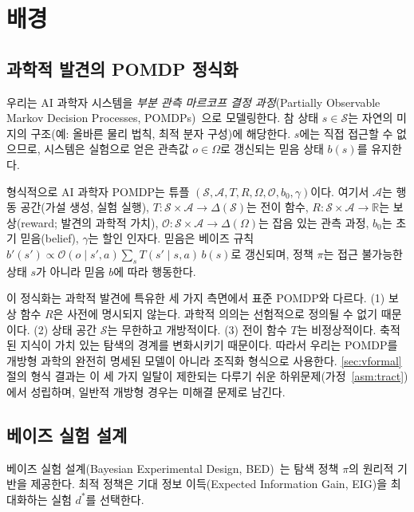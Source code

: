 \documentclass[11pt]{article}
\begin{document}
\section{배경}
\label{sec:background}

\subsection{과학적 발견의 POMDP 정식화}

우리는 AI 과학자 시스템을 \emph{부분 관측 마르코프 결정 과정}(Partially Observable Markov Decision Processes, POMDPs)~\citep{kaelbling1998pomdp}으로 모델링한다. 참 상태 $s \in \mathcal{S}$는 자연의 미지의 구조(예: 올바른 물리 법칙, 최적 분자 구성)에 해당한다. $s$에는 직접 접근할 수 없으므로, 시스템은 실험으로 얻은 관측값 $o \in \Omega$로 갱신되는 믿음 상태 $b(s)$를 유지한다.

형식적으로 AI 과학자 POMDP는 튜플 $(\mathcal{S}, \mathcal{A}, T, R, \Omega, \mathcal{O}, b_0, \gamma)$이다. 여기서 $\mathcal{A}$는 행동 공간(가설 생성, 실험 실행), $T: \mathcal{S} \times \mathcal{A} \rightarrow \Delta(\mathcal{S})$는 전이 함수, $R: \mathcal{S} \times \mathcal{A} \rightarrow \mathbb{R}$는 보상(reward; 발견의 과학적 가치), $\mathcal{O}: \mathcal{S} \times \mathcal{A} \rightarrow \Delta(\Omega)$는 잡음 있는 관측 과정, $b_0$는 초기 믿음(belief), $\gamma$는 할인 인자다. 믿음은 베이즈 규칙 $b'(s') \propto \mathcal{O}(o \mid s', a) \sum_{s} T(s' \mid s, a)\, b(s)$로 갱신되며, 정책 $\pi$는 접근 불가능한 상태 $s$가 아니라 믿음 $b$에 따라 행동한다.

이 정식화는 과학적 발견에 특유한 세 가지 측면에서 표준 POMDP와 다르다. (1) 보상 함수 $R$은 사전에 명시되지 않는다. 과학적 의의는 선험적으로 정의될 수 없기 때문이다. (2) 상태 공간 $\mathcal{S}$는 무한하고 개방적이다. (3) 전이 함수 $T$는 비정상적이다. 축적된 지식이 가치 있는 탐색의 경계를 변화시키기 때문이다. 따라서 우리는 POMDP를 개방형 과학의 완전히 명세된 모델이 아니라 조직화 형식으로 사용한다. \ref{sec:vformal}절의 형식 결과는 이 세 가지 일탈이 제한되는 다루기 쉬운 하위문제(가정~\ref{asm:tract})에서 성립하며, 일반적 개방형 경우는 미해결 문제로 남긴다.

\subsection{베이즈 실험 설계}

베이즈 실험 설계(Bayesian Experimental Design, BED)~\citep{chaloner1995bayesian,rainforth2024modern}는 탐색 정책 $\pi$의 원리적 기반을 제공한다. 최적 정책은 기대 정보 이득(Expected Information Gain, EIG)을 최대화하는 실험 $d^*$를 선택한다.
\end{document}

